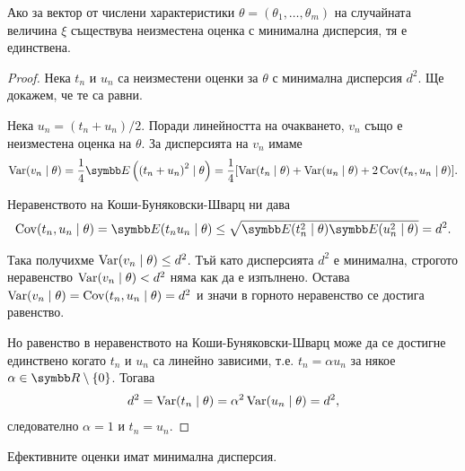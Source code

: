 \documentclass[numbers=endperiod, bibliography=totocnumbered]{scrartcl}
\begin{document}
\begin{theorem}
  Ако за вектор от числени характеристики \( \theta = (\theta_1, \ldots, \theta_m) \) на случайната величина \( \xi \) съществува неизместена оценка с минимална дисперсия, тя е единствена.
\end{theorem}
\begin{proof}
  Нека \( t_n \) и \( u_n \) са неизместени оценки за \( \theta \) с минимална дисперсия \( d^2 \). Ще докажем, че те са равни.

  Нека \( u_n = (t_n + u_n) / 2 \). Поради линейността на очакването, \( v_n \) също е неизместена оценка на \( \theta \). За дисперсията на \( v_n \) имаме
  \begin{align*}
    \Var(v_n \mid \theta)
    =
    \frac 1 4 \Expect \left( {(t_n + u_n)}^2 \mid \theta \right)
    =
    \frac 1 4 [\Var(t_n \mid \theta) + \Var(u_n \mid \theta) + 2 \Cov(t_n, u_n \mid \theta)].
  \end{align*}

  Неравенството на Коши-Буняковски-Шварц ни дава
  \begin{align*}
    \Cov(t_n, u_n \mid \theta)
    =
    \Expect(t_n u_n \mid \theta)
    \leq
    \sqrt {\Expect(t_n^2 \mid \theta) \Expect(u_n^2 \mid \theta)}
    =
    d^2.
  \end{align*}

  Така получихме \( \operatorname{Var}(v_n \mid \theta) \leq d^2 \). Тъй като дисперсията \( d^2 \) е минимална, строгото неравенство \( \operatorname{Var}(v_n \mid \theta) < d^2 \) няма как да е изпълнено. Остава \( \operatorname{Var}(v_n \mid \theta) = \operatorname{Cov}(t_n, u_n \mid \theta) = d^2 \) и значи в горното неравенство се достига равенство.

  Но равенство в неравенството на Коши-Буняковски-Шварц може да се достигне единствено когато \( t_n \) и \( u_n \) са линейно зависими, т.е. \( t_n = \alpha u_n \) за някое \( \alpha \in \R \setminus \{ 0 \} \). Тогава
  \begin{align*}
    d^2 = \operatorname{Var}(t_n \mid \theta) = \alpha^2 \operatorname{Var}(u_n \mid \theta) = d^2,
  \end{align*}
  следователно \( \alpha = 1 \) и \( t_n = u_n \).
\end{proof}

\begin{theorem}
  Ефективните оценки имат минимална дисперсия.
\end{theorem}
\end{document}
